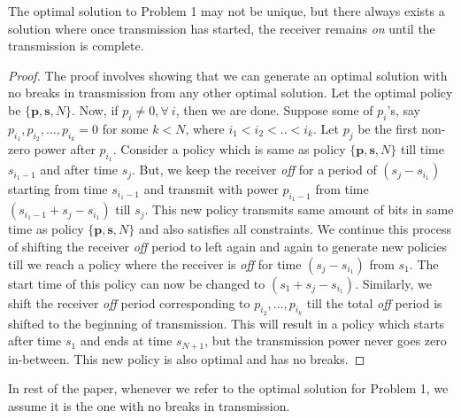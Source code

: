 \begin{lemma}
The optimal solution to Problem 1 may not be unique, but there always exists a solution where once transmission has started, the receiver remains \textit{on} until the transmission is complete. \label{lemma_nobreaks}
\end{lemma}
\begin{proof}
The proof involves showing that we can generate an optimal solution with no breaks in transmission from any other optimal solution. Let the optimal policy be $\{\textbf{p},\textbf{s},N\}$. Now, if $p_i\neq 0,\forall \ i$, then we are done. Suppose some of $p_i$'s, say $p_{i_1},p_{i_2},...,p_{i_k}=0$ for some $k<N$, where $i_1<i_2<..<i_k$. Let $p_j$ be the first non-zero power after $p_{i_1}$. Consider a policy which is same as policy $\{\textbf{p},\textbf{s},N\}$ till time $s_{i_1-1}$ and after time $s_{j}$. But, we keep the receiver \textit{off} for a period of $(s_{j}-s_{i_1})$ starting from time $s_{i_1-1}$ and transmit with power $p_{i_1-1}$ from time $(s_{i_1-1}+s_{j}-s_{i_1})$ till $s_j$. This new policy transmits same amount of bits in same time  as policy $\{\textbf{p},\textbf{s},N\}$ and also satisfies all constraints. We continue this process of shifting the receiver \textit{off} period to left again and again to generate new policies till we reach a policy where the receiver is \textit{off} for time $(s_{j}-s_{i_1})$ from $s_1$. The start time of this policy can now be changed to $(s_1+s_{j}-s_{i_1})$. Similarly, we shift the receiver \textit{off} period corresponding to $p_{i_2},...,p_{i_k}$ till the total \textit{off} period is shifted to the beginning of transmission. This will result in a policy which starts after time $s_1$ and ends at time $s_{N+1}$, but the transmission power never goes zero in-between. This new policy is also optimal and has no breaks.
\end{proof}
In rest of the paper, whenever we refer to the optimal solution for Problem 1, we assume it is the one with no breaks in transmission.
